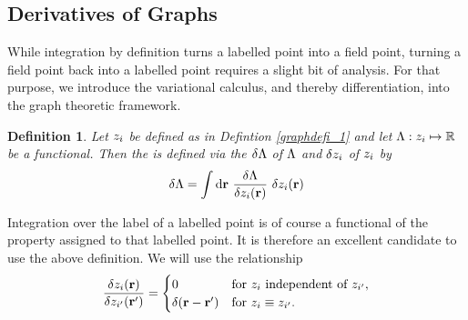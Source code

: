 \documentclass[8.5pt,twoside,twocolumn]{article}
\newcommand\di{\te{d}}
\newcommand\drr{\di\r\ }
\newcommand\zi{\enmat{z_i}}
\newcommand\zip{\enmat{z_{i'}}}
\renewcommand\r{\bo r}
\theoremstyle{standard}
\newtheorem{defi}[theo]{Definition}
\begin{document}
% 

\subsection{Derivatives of Graphs}

While integration by definition turns a labelled point into a field point, turning
a field point back into a labelled point requires a slight bit of analysis. For that purpose,
we introduce the variational calculus, and thereby differentiation, into the graph theoretic framework.

\begin{defi}
\label{funcderivative}
Let $\zi$ be defined as in Defintion \ref{graphdefi_1} and let $\La: \zi \mapsto \R$ be a functional.
Then the  \sdelti \La {\zi} is defined via the  $\delta\Lambda$ of $\Lambda$
and $\dl \zi$ of $\zi$ by
\begin{equation}
\dl\La = \int \drr \delti\La {\zi(\r)}\ \dl\zi(\r)
\label{FuncDeri}
\end{equation}
\end{defi}

Integration over the label of a labelled point is of course a functional of the property assigned
to that labelled point. It is therefore an excellent candidate to use the above definition. We
will use the relationship
\begin{align}
\label{difrelation}
\delti{\zi(\r)}{\zip(\r')} =
\begin{cases}
0 & \te{for }\zi\te{ independent of }\zip,\\
\dl(\r - \r') & \te{for }\zi\equiv \zip.
\end{cases}
\end{align}
\end{document}
